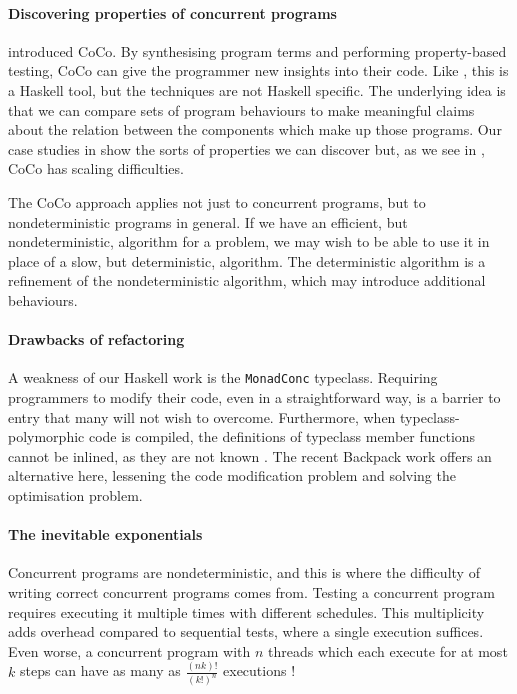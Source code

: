 \paragraph{Discovering properties of concurrent programs}
 introduced CoCo.  By synthesising program terms and
performing property-based testing, CoCo can give the programmer new
insights into their code.  Like \dejafu{}, this is a Haskell tool, but
the techniques are not Haskell specific.  The underlying idea is that
we can compare sets of program behaviours to make meaningful claims
about the relation between the components which make up those
programs.  Our case studies in  show the sorts of
properties we can discover but, as we see in
, CoCo has scaling difficulties.

The CoCo approach applies not just to concurrent programs, but to
nondeterministic programs in general.  If we have an efficient, but
nondeterministic, algorithm for a problem, we may wish to be able to
use it in place of a slow, but deterministic, algorithm.  The
deterministic algorithm is a refinement of the nondeterministic
algorithm, which may introduce additional behaviours.

\paragraph{Drawbacks of refactoring}
A weakness of our Haskell work is the \verb|MonadConc| typeclass.
Requiring programmers to modify their code, even in a straightforward
way, is a barrier to entry that many will not wish to overcome.
Furthermore, when typeclass-polymorphic code is compiled, the
definitions of typeclass member functions cannot be inlined, as they
are not known \parencite{peytonjones2002}.  The recent Backpack
work \parencite{yang2017} offers an alternative here, lessening the code
modification problem and solving the optimisation problem.

\paragraph{The inevitable exponentials}
Concurrent programs are nondeterministic, and this is where the
difficulty of writing correct concurrent programs comes from.  Testing
a concurrent program requires executing it multiple times with
different schedules.  This multiplicity adds overhead compared to
sequential tests, where a single execution suffices.  Even worse, a
concurrent program with $n$ threads which each execute for at most $k$
steps can have as many as $\frac{(nk)!}{(k!)^{n}}$ executions
\parencite{musuvathi2007}!

